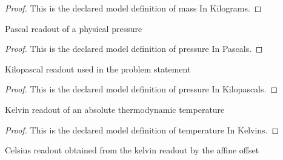 \begin{proof}
  This is the declared model definition of mass In Kilograms.
\end{proof}
\begin{definition}
  \label{def:physics:phyx-mini-0446:phyxminiproblems-problemphyxmini0446-pressureinpascals}
  Pascal readout of a physical pressure
\end{definition}
\begin{proof}
  This is the declared model definition of pressure In Pascals.
\end{proof}
\begin{definition}
  \label{def:physics:phyx-mini-0446:phyxminiproblems-problemphyxmini0446-pressureinkilopascals}
  Kilopascal readout used in the problem statement
\end{definition}
\begin{proof}
  This is the declared model definition of pressure In Kilopascals.
\end{proof}
\begin{definition}
  \label{def:physics:phyx-mini-0446:phyxminiproblems-problemphyxmini0446-temperatureinkelvins}
  Kelvin readout of an absolute thermodynamic temperature
\end{definition}
\begin{proof}
  This is the declared model definition of temperature In Kelvins.
\end{proof}
\begin{definition}
  \label{def:physics:phyx-mini-0446:phyxminiproblems-problemphyxmini0446-temperatureindegreescelsius}
  Celsius readout obtained from the kelvin readout by the affine offset
\end{definition}
